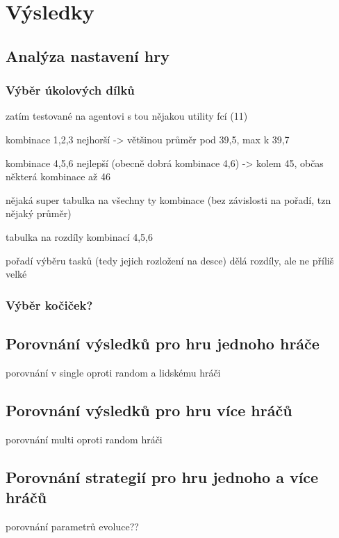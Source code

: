\chapter{Výsledky}

\section{Analýza nastavení hry}
\subsection{Výběr úkolových dílků}
zatím testované na agentovi s tou nějakou utility fcí (11)

kombinace 1,2,3 nejhorší -> většinou průměr pod 39,5, max k 39,7

kombinace 4,5,6 nejlepší (obecně dobrá kombinace 4,6) -> kolem 45, občas některá kombinace až 46

nějaká super tabulka na všechny ty kombinace (bez závislosti na pořadí, tzn nějaký průměr)

tabulka na rozdíly kombinací 4,5,6

pořadí výběru tasků (tedy jejich rozložení na desce) dělá rozdíly, ale ne příliš velké
\subsection{Výběr kočiček?}


\section{Porovnání výsledků pro hru jednoho hráče}
porovnání v single oproti random a lidskému hráči

\section{Porovnání výsledků pro hru více hráčů}
porovnání multi oproti random hráči

\section{Porovnání strategií pro hru jednoho a více hráčů}

porovnání parametrů evoluce??

